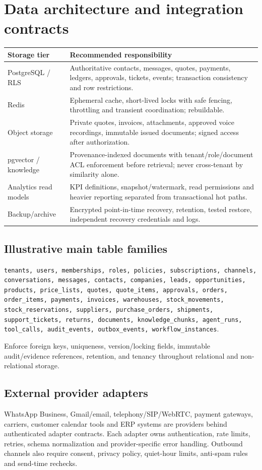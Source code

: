 \documentclass[10.5pt,a4paper,oneside]{article}
\begin{document}
\section{Data architecture and integration contracts}
\begin{tabularx}{\textwidth}{@{}L{32mm}Y@{}}
\toprule{}\textbf{Storage tier} & \textbf{Recommended responsibility}\\\midrule
PostgreSQL / RLS & Authoritative contacts, messages, quotes, payments, ledgers, approvals, tickets, events; transaction consistency and row restrictions.\\
Redis & Ephemeral cache, short-lived locks with safe fencing, throttling and transient coordination; rebuildable.\\
Object storage & Private quotes, invoices, attachments, approved voice recordings, immutable issued documents; signed access after authorization.\\
pgvector / knowledge & Provenance-indexed documents with tenant/role/document ACL enforcement before retrieval; never cross-tenant by similarity alone.\\
Analytics read models & KPI definitions, snapshot/watermark, read permissions and heavier reporting separated from transactional hot paths.\\
Backup/archive & Encrypted point-in-time recovery, retention, tested restore, independent recovery credentials and logs.\\
\bottomrule
\end{tabularx}
\subsection{Illustrative main table families}
\texttt{tenants, users, memberships, roles, policies, subscriptions, channels, conversations, messages, contacts, companies, leads, opportunities, products, price\_lists, quotes, quote\_items, approvals, orders, order\_items, payments, invoices, warehouses, stock\_movements, stock\_reservations, suppliers, purchase\_orders, shipments, support\_tickets, returns, documents, knowledge\_chunks, agent\_runs, tool\_calls, audit\_events, outbox\_events, workflow\_instances}.\par\smallskip
Enforce foreign keys, uniqueness, version/locking fields, immutable audit/evidence references, retention, and tenancy throughout relational and non-relational storage.
\subsection{External provider adapters}
WhatsApp Business, Gmail/email, telephony/SIP/WebRTC, payment gateways, carriers, customer calendar tools and ERP systems are providers behind authenticated adapter contracts. Each adapter owns authentication, rate limits, retries, schema normalization and provider-specific error handling. Outbound channels also require consent, privacy policy, quiet-hour limits, anti-spam rules and send-time rechecks.
\end{document}
